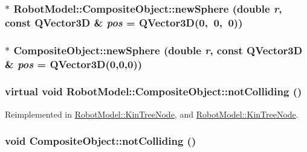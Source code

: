 \label{class_robot_model_1_1_composite_object_a196a2811a85c1313f781b140f2ab313e}
\hypertarget{class_robot_model_1_1_composite_object_a6e54f38a81dcd568e8e6fc0373e94586}{
\subsubsection[{newSphere}]{$\ast$ RobotModel::CompositeObject::newSphere (double {\em r}, \/  const QVector3D \& {\em pos} = {\ttfamily QVector3D(0,~0,~0)})}}
\label{class_robot_model_1_1_composite_object_a6e54f38a81dcd568e8e6fc0373e94586}
\hypertarget{class_robot_model_1_1_composite_object_aa5b61818415089630ee37a3767b5c37c}{
\subsubsection[{newSphere}]{ $\ast$ CompositeObject::newSphere (double {\em r}, \/  const QVector3D \& {\em pos} = {\ttfamily QVector3D(0,0,0)})}}
\label{class_robot_model_1_1_composite_object_aa5b61818415089630ee37a3767b5c37c}
\hypertarget{class_robot_model_1_1_composite_object_ad54b0cbb3ed8ac1109ffcb6b587f8244}{
\subsubsection[{notColliding}]{\setlength{\rightskip}{0pt plus 5cm}virtual void RobotModel::CompositeObject::notColliding ()}}
\label{class_robot_model_1_1_composite_object_ad54b0cbb3ed8ac1109ffcb6b587f8244}


Reimplemented in \hyperlink{class_robot_model_1_1_kin_tree_node_ae5d72a496f39cad4e266c11d75d4731c}{RobotModel::KinTreeNode}, and \hyperlink{class_robot_model_1_1_kin_tree_node_a08e95447cbb2963b03afbac17215aa00}{RobotModel::KinTreeNode}.\hypertarget{class_robot_model_1_1_composite_object_a00db0d1a45893ef058e7abbad5083b6b}{
\subsubsection[{notColliding}]{\setlength{\rightskip}{0pt plus 5cm}void CompositeObject::notColliding ()}}
\label{class_robot_model_1_1_composite_object_a00db0d1a45893ef058e7abbad5083b6b}


